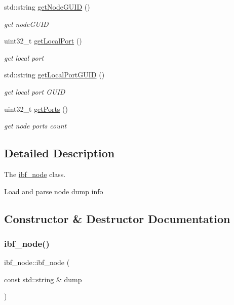 \begin{DoxyCompactItemize}
std\+::string \mbox{\hyperlink{classibf__node_afe265cfd9c0423988b063c0356058a99}{get\+Node\+G\+U\+ID}} ()
\begin{DoxyCompactList}\small\item\em get node\+G\+U\+ID \end{DoxyCompactList}\item 
uint32\+\_\+t \mbox{\hyperlink{classibf__node_a1edc2663a50b193be7b9a615cc288837}{get\+Local\+Port}} ()
\begin{DoxyCompactList}\small\item\em get local port \end{DoxyCompactList}\item 
std\+::string \mbox{\hyperlink{classibf__node_a286ee4769949a09e9bcbdbc88d9a820c}{get\+Local\+Port\+G\+U\+ID}} ()
\begin{DoxyCompactList}\small\item\em get local port G\+U\+ID \end{DoxyCompactList}\item 
uint32\+\_\+t \mbox{\hyperlink{classibf__node_a82c225df0e9a802f8b146c1a7c069bdb}{get\+Ports}} ()
\begin{DoxyCompactList}\small\item\em get node ports count \end{DoxyCompactList}\end{DoxyCompactItemize}


\subsection{Detailed Description}
The \mbox{\hyperlink{classibf__node}{ibf\+\_\+node}} class. 

Load and parse node dump info 

\subsection{Constructor \& Destructor Documentation}
\mbox{\label{classibf__node_a523e0518169d8e30b68d9188a51b6c1a}} 
\subsubsection{\texorpdfstring{ibf\+\_\+node()}{ibf\_node()}}
{\footnotesize\ttfamily ibf\+\_\+node\+::ibf\+\_\+node (\begin{DoxyParamCaption}\item[{const std\+::string \&}]{dump }\end{DoxyParamCaption})}




